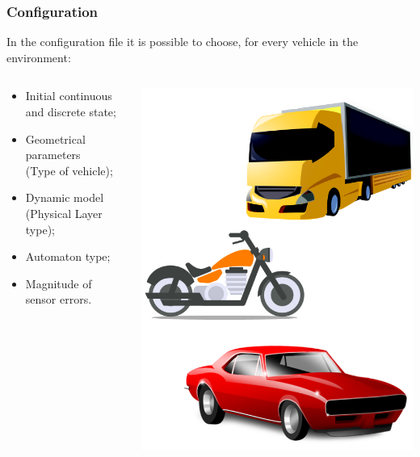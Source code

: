 \documentclass{beamer}
\begin{document}
\begin{frame}
\frametitle{Configuration}

In the configuration file it is possible to choose, for every vehicle in the environment:
\begin{columns}
\begin{column}{0.6\textwidth}
\begin{itemize}
\item Initial continuous and discrete state;
\item Geometrical parameters \\(Type of vehicle);
\item Dynamic model (Physical Layer type);
\item Automaton type;
\item Magnitude of sensor errors.
\end{itemize}
\end{column}
\begin{column}{0.4\textwidth}
\centering
\includegraphics[scale=0.15]{vehicletypes}
\end{column}
\end{columns}



\end{frame}
\end{document}
